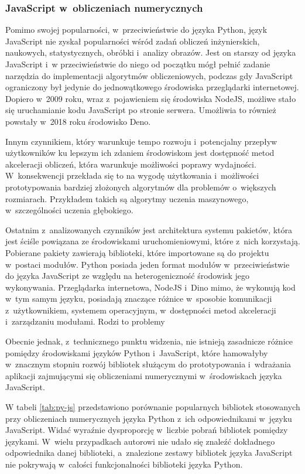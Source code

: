 \subsubsection{JavaScript w~obliczeniach numerycznych}

Pomimo swojej popularności, w~przeciwieństwie do języka Python, język JavaScript nie zyskał popularności wśród zadań obliczeń inżynierskich, naukowych, statystycznych, obróbki i~analizy obrazów. Jest on starszy od języka JavaScript i~w przeciwieństwie do niego od początku mógł pełnić zadanie narzędzia do implementacji algorytmów obliczeniowych, podczas gdy JavaScript ograniczony był jedynie do jednowątkowego środowiska przeglądarki internetowej. Dopiero w~2009 roku, wraz z~pojawieniem się środowiska NodeJS, możliwe stało się uruchamianie kodu JavaScript po stronie serwera. Umożliwia to również powstały w~2018 roku środowisko Deno. 

Innym czynnikiem, który warunkuje tempo rozwoju i~potencjalny przepływ użytkowników ku lepszym ich zdaniem środowiskom jest dostępność metod akceleracji obliczeń, która warunkuje możliwości poprawy wydajności. W~konsekwencji przekłada się to na wygodę użytkowania i~możliwości prototypowania bardziej złożonych algorytmów dla problemów o~większych rozmiarach. Przykładem takich są algorytmy uczenia maszynowego, w~szczególności uczenia głębokiego.

Ostatnim z~analizowanych czynników jest architektura systemu pakietów, która jest ściśle powiązana ze środowiskami uruchomieniowymi, które z~nich korzystają. Pobierane pakiety zawierają biblioteki, które importowane są do projektu w~postaci modułów. Python posiada jeden format modułów w~przeciwieństwie do języka JavaScript ze względu na heterogeniczność środowisk jego wykonywania. Przeglądarka internetowa, NodeJS i~Dino mimo, że wykonują kod w~tym samym języku, posiadają znaczące różnice w~sposobie komunikacji z~użytkownikiem, systemem operacyjnym, w~dostępności metod akceleracji i~zarządzaniu modułami. Rodzi to problemy 

Obecnie jednak, z~technicznego punktu widzenia, nie istnieją zasadnicze różnice pomiędzy środowiskami języków Python i~JavaScript, które hamowałyby w~znacznym stopniu rozwój bibliotek służącym do prototypowania i~wdrażania aplikacji zajmującymi się obliczeniami numerycznymi w~środowiskach języka JavaScript.

W tabeli \ref{tab:py-js} przedstawiono porównanie popularnych bibliotek stosowanych przy obliczeniach numerycznych języka Python z~ich odpowiednikami w~języku JavaScript. Widać wyraźnie dysproporcję w~liczbie pobrań bibliotek pomiędzy językami. W~wielu przypadkach autorowi nie udało się znaleźć dokładnego odpowiednika danej biblioteki, a~znalezione zestawy bibliotek języka JavaScript nie pokrywają w~całości funkcjonalności biblioteki języka Python.

